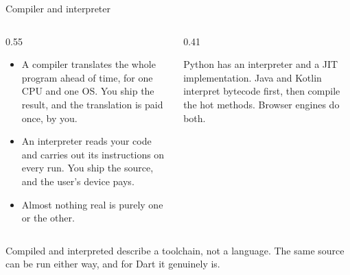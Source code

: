 \documentclass[10pt,aspectratio=169,t]{beamer}
\begin{document}
\begin{frame}[eyebrow=How code runs]{Compiler and interpreter}
  \vskip 2mm
  \begin{columns}[T]
    \begin{column}{0.55\textwidth}
      \begin{itemize}
        \item A compiler translates the whole program ahead of time, for one CPU and one OS. You ship the result, and the translation is paid once, by you.
        \item An interpreter reads your code and carries out its instructions on every run. You ship the source, and the user's device pays.
        \item Almost nothing real is purely one or the other.
      \end{itemize}
    \end{column}
    \begin{column}{0.41\textwidth}
      \begin{hint}
        Python has an interpreter and a JIT implementation. Java and Kotlin interpret bytecode first, then compile the hot methods. Browser engines do both.
      \end{hint}
    \end{column}
  \end{columns}
  \begin{takeaway}{Compiled and interpreted describe a toolchain, not a language.}
    The same source can be run either way, and for Dart it genuinely is.
  \end{takeaway}
\end{frame}
\end{document}
